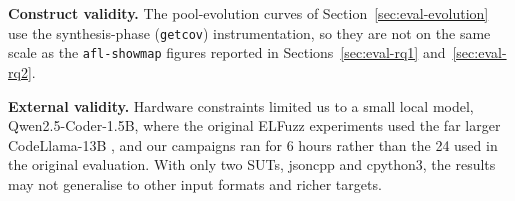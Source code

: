 \textbf{Construct validity.} The pool-evolution curves of Section~\ref{sec:eval-evolution} use the synthesis-phase (\texttt{getcov}) instrumentation, so they are not on the same scale as the \texttt{afl-showmap} figures reported in Sections~\ref{sec:eval-rq1} and~\ref{sec:eval-rq2}.

\textbf{External validity.} Hardware constraints limited us to a small local model, Qwen2.5-Coder-1.5B, where the original ELFuzz experiments used the far larger CodeLlama-13B \cite{chen_2025_elfuzz}, and our campaigns ran for 6 hours rather than the 24 used in the original evaluation. With only two SUTs, jsoncpp and cpython3, the results may not generalise to other input formats and richer targets.

